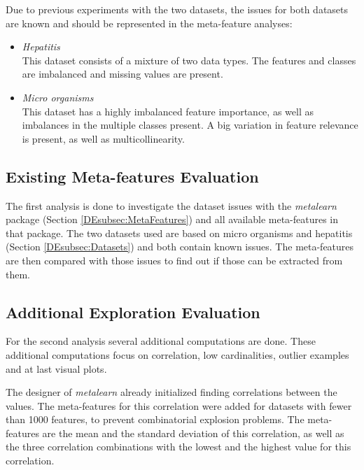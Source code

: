 \documentclass[10pt,a4paper]{report}
\begin{document}
	Due to previous experiments with the two datasets, the issues for both datasets are known and should be represented in the meta-feature analyses:
	
	\begin{itemize}
		\item \textit{Hepatitis} \\ 
		This dataset consists of a mixture of two data types. The features and classes are imbalanced and missing values are present.
		\item \textit{Micro organisms} \\ 
		This dataset has a highly imbalanced feature importance, as well as imbalances in the multiple classes present. A big variation in feature relevance is present, as well as multicollinearity.
	\end{itemize}
	
	\subsection{Existing Meta-features Evaluation}
	\label{DEsubsec:MethodsExistingEvaluation}
	
	The first analysis is done to investigate the dataset issues with the \textit{metalearn} package (Section \ref{DEsubsec:MetaFeatures}) and all available meta-features in that package. The two datasets used are based on micro organisms and hepatitis (Section \ref{DEsubsec:Datasets}) and both contain known issues. The meta-features are then compared with those issues to find out if those can be extracted from them.
	
	\subsection{Additional Exploration Evaluation}
	\label{DEsubsec:MethodsAdditionalEvaluation}	
	
	For the second analysis several additional computations are done. These additional computations focus on correlation, low cardinalities, outlier examples and at last visual plots.
	
	The designer of \textit{metalearn} already initialized finding correlations between the values. The meta-features for this correlation were added for datasets with fewer than 1000 features, to prevent combinatorial explosion problems. The meta-features are the mean and the standard deviation of this correlation, as well as the three correlation combinations with the lowest and the highest value for this correlation.
	
\end{document}
